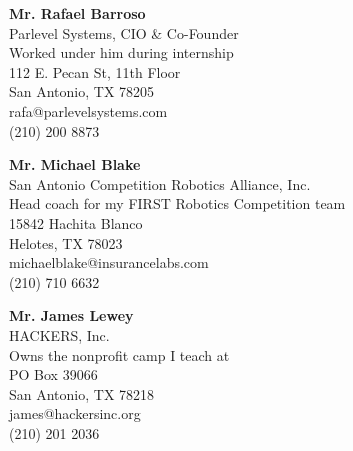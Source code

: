 \textbf{Mr. Rafael Barroso} \\
Parlevel Systems, CIO \& Co-Founder \\
Worked under him during internship \\
112 E. Pecan St, 11th Floor \\
San Antonio, TX 78205 \\
rafa@parlevelsystems.com \\
(210) 200 8873

\vspace{40pt}
\textbf{Mr. Michael Blake} \\
San Antonio Competition Robotics Alliance, Inc. \\
Head coach for my FIRST Robotics Competition team \\
15842 Hachita Blanco \\
Helotes, TX 78023 \\
michaelblake@insurancelabs.com \\
(210) 710 6632

\vspace{40pt}
\textbf{Mr. James Lewey} \\
HACKERS, Inc. \\
Owns the nonprofit camp I teach at \\
PO Box 39066 \\
San Antonio, TX 78218 \\
james@hackersinc.org \\
(210) 201 2036


